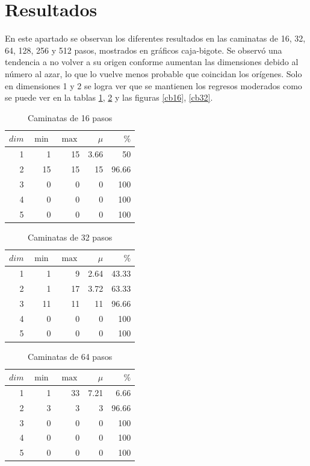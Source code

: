 \documentclass[a4paper, 11pt]{article}
\begin{document}
\section{Resultados}
En este apartado se observan los diferentes resultados en las caminatas de 16, 32, 64, 128, 256 y 512 pasos, mostrados en gráficos caja-bigote.
Se observ\'o una tendencia a no volver a su origen conforme aumentan las dimensiones debido al n\'umero al azar, lo que lo vuelve menos probable que coincidan los orígenes. Solo en dimensiones 1 y 2 se logra ver que se mantienen los regresos moderados como se puede ver en la tablas \ref{tab1}, \ref{tab2} y las figuras \ref{cb16}, \ref{cb32}.

    \begin{table}[H]
        \caption{Caminatas de 16 pasos}
        \bigskip
        \label{tab1}
        \centering
        \begin{tabular}{|r|rrr|r|}
        \hline
        $dim$&$\min$&$\max$&$\mu$&$\%$\\
        \hline
        1 & 1 &  15 & 3.66 & 50 \\
        2 & 15 & 15 & 15 & 96.66\\
        3 & 0 &  0 & 0 & 100    \\
        4 & 0 &  0 & 0 & 100    \\
        5 & 0 &  0 & 0 & 100    \\
        \hline
        \end{tabular}
    \end{table}
    \begin{table}[H]
        \caption{Caminatas de 32 pasos}
        \bigskip
        \label{tab2}
        \centering
        \begin{tabular}{|r|rrr|r|}
        \hline
        $dim$&$\min$&$\max$&$\mu$&$\%$\\
        \hline
        1 & 1 & 9 & 2.64 & 43.33 \\
        2 & 1 & 17 & 3.72 & 63.33\\
        3 & 11 & 11 & 11 & 96.66    \\
        4 & 0 &  0 & 0 & 100    \\
        5 & 0 &  0 & 0 & 100    \\
        \hline
        \end{tabular}
    \end{table}
    \begin{table}[H]
        \caption{Caminatas de 64 pasos}
        \bigskip
        \label{tab3}
        \centering
        \begin{tabular}{|r|rrr|r|}
        \hline
        $dim$&$\min$&$\max$&$\mu$&$\%$\\
        \hline
        1 & 1 &  33 & 7.21 & 6.66 \\
        2 & 3 & 3 & 3 & 96.66 \\
        3 & 0 & 0 & 0 & 100    \\
        4 & 0 & 0 & 0 & 100    \\
        5 & 0 & 0 & 0 & 100    \\
        \hline
        \end{tabular}
    \end{table}
\end{document}
